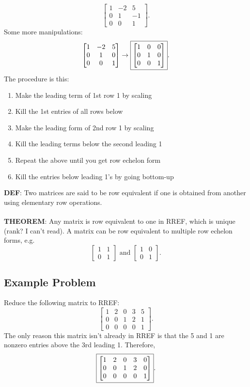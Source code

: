 \documentclass[letterpaper]{report}
\begin{document}
\[
\begin{bmatrix} 
    1 & -2 & 5 \\
    0 & 1 & -1 \\
    0 & 0 & 1
\end{bmatrix} 
.\] 
Some more manipulations: 
\[
\begin{bmatrix} 
    1 & -2 & 5 \\
    0 & 1 & 0 \\
    0 & 0 & 1
\end{bmatrix} 
\rightarrow
\fbox{$
\begin{bmatrix} 
    1 & 0 & 0 \\
    0 & 1 & 0 \\
    0 & 0 & 1
\end{bmatrix}$}
.\] \newpage
The procedure is this: 
\begin{enumerate}
    \item  Make the leading term of 1st row 1 by scaling
    \item Kill the 1st entries of all rows below
    \item Make the leading form of 2nd row 1 by scaling
    \item Kill the leading terms below the second leading 1
    \item Repeat the above until you get row echelon form
    \item Kill the entries below leading 1's by going bottom-up
\end{enumerate}
\textbf{DEF}: Two matrices are said to be row equivalent if one is obtained from another using elementary row operations. \\ \\ 
\textbf{THEOREM}: Any matrix is row equivalent to one in RREF, which is unique (rank? I can't read). A matrix can be row equivalent to multiple row echelon forms, e.g.
\[
\begin{bmatrix} 
    1 & 1 \\
    0 & 1
\end{bmatrix} 
\text{ and }
\begin{bmatrix} 
    1 & 0 \\
    0 & 1
\end{bmatrix} 
.\] 
\subsection{Example Problem}%
\label{sub:Example Problem}
Reduce the following matrix to RREF: 
\[
\begin{bmatrix} 
    1 & 2 & 0 & 3 & 5 \\
    0 & 0 & 1 & 2 & 1 \\
    0 & 0 & 0 & 0 & 1
\end{bmatrix} 
.\] 
The only reason this matrix isn't already in RREF is that the 5 and 1 are nonzero entries above the 3rd leading 1. Therefore, 
\[
\fbox{$
\begin{bmatrix} 
    1 & 2 & 0 & 3 & 0 \\
    0 & 0 & 1 & 2 & 0 \\
    0 & 0 & 0 & 0 & 1
\end{bmatrix}$}
.\] 
\end{document}
